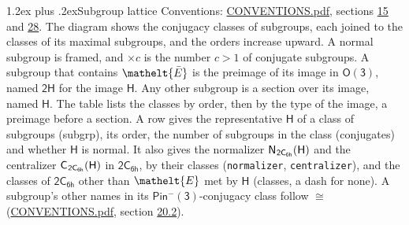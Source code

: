 \documentclass[10pt,a4paper]{article}
\makeatletter
\renewcommand\section{\@startsection{section}{1}{\z@}{-3ex plus -1ex minus -.2ex}%
  {1.2ex plus .2ex}{\normalfont\large\sffamily\bfseries\color{parttitle}}}
\numberwithin{equation}{section}
\newcommand{\eltfont}[1]{{\let\sigma\eltsigma\mathelt{#1}}}
\newcommand{\grp}[1]{\mathsf{#1}}
\newcommand{\cls}[1]{\eltfont{#1}}
\newcommand{\elt}[1]{\eltfont{#1}}
\newcommand{\samecls}{\cong}
\newcommand{\barred}[1]{\bar{#1}}
\newcommand{\hairsp}{\mkern1mu}
\makeatother
\begin{document}
\section{Subgroup lattice}\label{s:subgroups}
Conventions: \href{../../CONVENTIONS.pdf}{CONVENTIONS.pdf}, sections \href{../../../rotation/CONVENTIONS.pdf\#conv.15}{15} and \href{../../CONVENTIONS.pdf\#conv.28}{28}.
The diagram shows the conjugacy classes of subgroups, each joined to the classes of its maximal subgroups, and the orders increase upward. \label{n:index.conjugates.c}A normal subgroup is framed, and ${\times}c$ is the number $c > 1$ of conjugate subgroups. \label{n:group.H}A subgroup that contains $\elt{\barred{E}}$ is the preimage of its image in $\grp{O(3)}$, named $\grp{2H}$ for the image $\grp{H}$. Any other subgroup is a section over its image, named $\grp{H}$. The table lists the classes by order, then by the type of the image, a preimage before a section. \label{n:head.subgroup}\label{n:head.order}\label{n:head.conjugates}\label{n:head.normal}A row gives the representative $\grp{H}$ of a class of subgroups (subgrp), its order, the number of subgroups in the class (conjugates) and whether $\grp{H}$ is normal. \label{n:group.normalizer}\label{n:group.centralizer}\label{n:head.classes}It also gives the normalizer $\grp{N}_{\hairsp \grp{2C_{6h}}}(\grp{H})$ and the centralizer $\grp{C}_{\hairsp \grp{2C_{6h}}}(\grp{H})$ in $\grp{2C_{6h}}$, by their classes (\texttt{normalizer}, \texttt{centralizer}), and the classes of $\grp{2C_{6h}}$ other than $\cls{E}$ met by $\grp{H}$ (classes, a dash for none). A subgroup's other names in its \href{Pinminus3.pdf}{$\grp{Pin^{-}(3)}$}-conjugacy class follow $\samecls$ (\href{../../CONVENTIONS.pdf}{CONVENTIONS.pdf}, section \href{../../CONVENTIONS.pdf\#conv.20.2}{20.2}).
\end{document}
